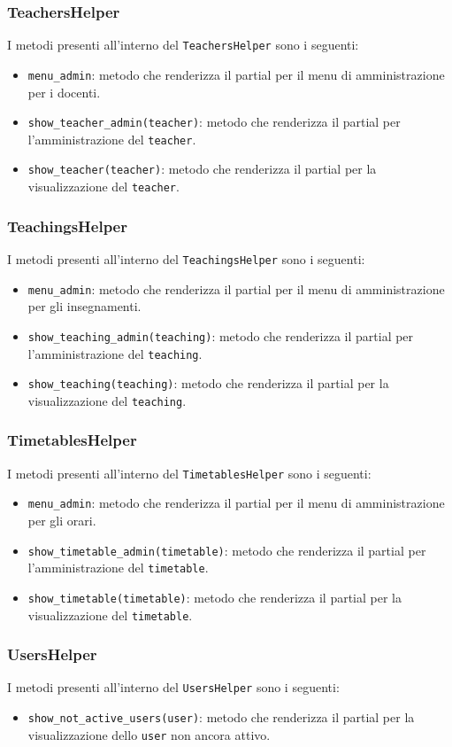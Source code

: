 \documentclass[11pt,a4paper]{article}
\begin{document}
\subsubsection{TeachersHelper}
I metodi presenti all'interno del \verb|TeachersHelper| sono i seguenti:
\begin{itemize}
 \item \verb|menu_admin|: metodo che renderizza il partial per il menu di amministrazione per i docenti.
 \item \verb|show_teacher_admin(teacher)|: metodo che renderizza il partial per l'amministrazione del \verb|teacher|.
 \item \verb|show_teacher(teacher)|: metodo che renderizza il partial per la visualizzazione del \verb|teacher|.
\end{itemize}
\subsubsection{TeachingsHelper}
I metodi presenti all'interno del \verb|TeachingsHelper| sono i seguenti:
\begin{itemize}
 \item \verb|menu_admin|: metodo che renderizza il partial per il menu di amministrazione per gli insegnamenti.
 \item \verb|show_teaching_admin(teaching)|: metodo che renderizza il partial per l'amministrazione del \verb|teaching|.
 \item \verb|show_teaching(teaching)|: metodo che renderizza il partial per la visualizzazione del \verb|teaching|.
\end{itemize}
\subsubsection{TimetablesHelper}
I metodi presenti all'interno del \verb|TimetablesHelper| sono i seguenti:
\begin{itemize}
 \item \verb|menu_admin|: metodo che renderizza il partial per il menu di amministrazione per gli orari.
 \item \verb|show_timetable_admin(timetable)|: metodo che renderizza il partial per l'amministrazione del \verb|timetable|.
 \item \verb|show_timetable(timetable)|: metodo che renderizza il partial per la visualizzazione del \verb|timetable|.
\end{itemize}
\subsubsection{UsersHelper}
I metodi presenti all'interno del \verb|UsersHelper| sono i seguenti:
\begin{itemize}
 \item \verb|show_not_active_users(user)|: metodo che renderizza il partial per la visualizzazione dello \verb|user| non ancora attivo.
\end{itemize}
\newpage
\end{document}

